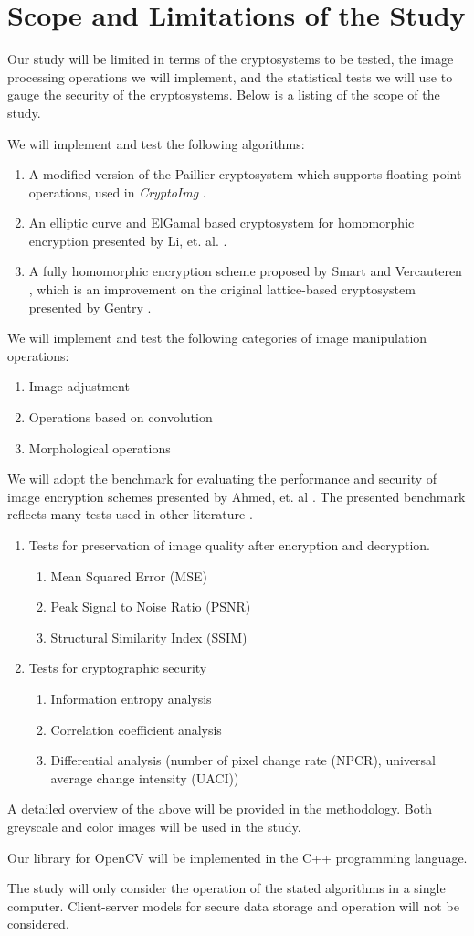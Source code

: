 \section{Scope and Limitations of the Study}
Our study will be limited in terms of the cryptosystems to be tested, the image processing operations we will implement, and the statistical tests we will use to gauge the security of the cryptosystems. Below is a listing of the scope of the study.

We will implement and test the following algorithms:
\begin{enumerate}
	\item A modified version of the Paillier cryptosystem \cite{stern_public-key_1999} which supports floating-point operations, used in \textit{CryptoImg} \cite{ziad_cryptoimg:_2016}.
	\item An elliptic curve and ElGamal based cryptosystem for homomorphic encryption presented by Li, et. al. \cite{li_elliptic_2012}.
	\item A fully homomorphic encryption scheme proposed by Smart and Vercauteren \cite{hutchison_fully_2010}, which is an improvement on the original lattice-based cryptosystem presented by Gentry \cite{gentry_fully_2009}.
\end{enumerate}
We will implement and test the following categories of image manipulation operations:
\begin{enumerate}
	\item Image adjustment
	\item Operations based on convolution
	\item Morphological operations
\end{enumerate}
We will adopt the benchmark for evaluating the performance and security of image encryption schemes presented by Ahmed, et. al \cite{ahmed_benchmark_2016}. The presented benchmark reflects many tests used in other literature \cite{ahmad_efficiency_2012, wu_npcr_2011}.
\begin{enumerate}
	\item Tests for preservation of image quality after encryption and decryption.
	\begin{enumerate}
		\item Mean Squared Error (MSE)
		\item Peak Signal to Noise Ratio (PSNR)
		\item Structural Similarity Index (SSIM)
	\end{enumerate}
	\item Tests for cryptographic security
	\begin{enumerate}
		\item Information entropy analysis
		\item Correlation coefficient analysis
		\item Differential analysis (number of pixel change rate (NPCR), universal average change intensity (UACI))
	\end{enumerate}
\end{enumerate}
A detailed overview of the above will be provided in the methodology.
Both greyscale and color images will be used in the study.

Our library for OpenCV will be implemented in the C++ programming language.

The study will only consider the operation of the stated algorithms in a single computer. Client-server models for secure data storage and operation will not be considered.
